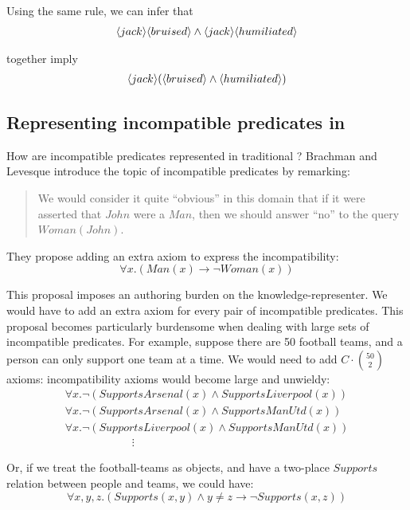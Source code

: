 \NI Using the same rule, we can infer that
\begin{eqnarray*}
   \langle jack \rangle \langle bruised \rangle \land \langle jack \rangle \langle humiliated \rangle \end{eqnarray*}

\NI together imply
\begin{eqnarray*}
\langle jack \rangle (\langle bruised \rangle \land \langle humiliated \rangle )
\end{eqnarray*}
 
\subsection{Representing incompatible predicates in \FOL}\label{incompatiblepredicatesinfol}

\NI How are incompatible predicates represented in traditional
\fol{}?  Brachman and Levesque\cite{brachman} introduce the
topic of incompatible predicates by remarking:
\begin{quote}
   We would consider it quite ``obvious'' in this domain that if it
   were asserted that $John$ were a $Man$, then we should answer
   ``no'' to the query $Woman(John)$.
\end{quote}

\NI They propose adding an extra axiom to express the incompatibility:
\[
   \forall x. ( Man(x) \rightarrow \neg Woman(x) )
\]  
 
\NI This proposal imposes an authoring burden on the
knowledge-representer.  We would have to add an extra axiom for every
pair of incompatible predicates.  This proposal becomes particularly
burdensome when dealing with large sets of incompatible predicates.
For example, suppose there are 50 football teams, and a person can
only support one team at a time.  We would need to add $C \cdot {50 \choose 2}$
axioms: incompatibility axioms would become large and unwieldy:
\[
\begin{array}{l}
  \forall x.  \neg (SupportsArsenal(x) \land SupportsLiverpool(x))  \\
  \forall x.  \neg (SupportsArsenal(x) \land SupportsManUtd(x))  \\
  \forall x.  \neg (SupportsLiverpool(x) \land SupportsManUtd(x))  \\
  \qquad \qquad \qquad \vdots
\end{array}
\]

\NI Or, if we treat the football-teams as objects, and have a
two-place $Supports$ relation between people and teams, we could have:
\[
   \forall x, y, z. (Supports(x,y) \land y \neq z \rightarrow \neg Supports(x,z))
\]   

